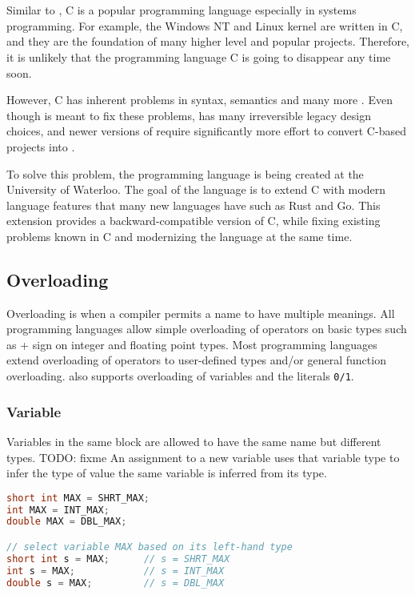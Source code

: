 \chapter{\CFA} \label{CFA}
Similar to \CC, C is a popular programming language especially in systems
programming. For example, the Windows NT and Linux kernel are written in C, and they are the foundation of many higher level
and popular projects. Therefore, it is unlikely that the programming language C is
going to disappear any time soon.

However, C has inherent problems in syntax, semantics and many
more \cite{reference2}. Even though \CCS is meant to fix these problems, \CCS has many
irreversible legacy design choices, and newer versions of \CCS require significantly more effort to convert C-based projects into \CCS.

To solve this problem, the programming language \CFAS is being created at the University of Waterloo. The goal
of the language is to extend C with modern language features that many new
languages have such as Rust and Go. This extension provides a
backward-compatible version of C, while fixing existing problems known in C and
modernizing the language at the same time.

\section{Overloading}
Overloading is when a compiler permits a name to have multiple meanings. All
programming languages allow simple overloading of operators on basic types such
as + sign on integer and floating point types. Most programming languages extend
overloading of operators to user-defined types and/or general function
overloading. \CFAS also supports overloading of variables and the literals \verb|0/1|.

\subsection{Variable}
Variables in the same block are allowed to have the same name but different
types.
TODO: fixme
An assignment to a new variable uses that variable type to infer the
type of value the same variable is inferred from its type.


\begin{lstlisting}[language=C++, caption={Overloading variables in \CFA}, label={CFA-overload-var}]
short int MAX = SHRT_MAX;
int MAX = INT_MAX;
double MAX = DBL_MAX;

// select variable MAX based on its left-hand type
short int s = MAX;      // s = SHRT_MAX
int s = MAX;            // s = INT_MAX
double s = MAX;         // s = DBL_MAX
\end{lstlisting}

